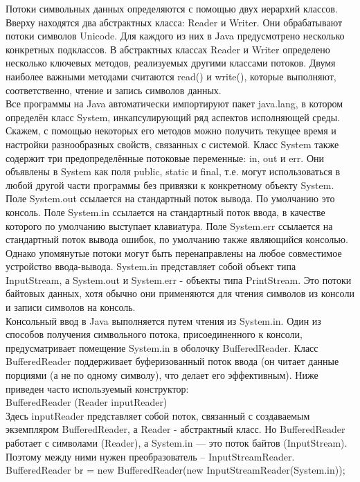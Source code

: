 Потоки символьных данных определяются с помощью двух иерархий классов. Вверху находятся два абстрактных класса: Reader и Writer. Они обрабатывают потоки символов Unicode. Для каждого из них в Java предусмотрено несколько конкретных подклассов. В абстрактных классах Reader и Writer определено несколько ключевых методов, реализуемых другими классами потоков. Двумя наиболее важными методами считаются read() и write(), которые выполняют, соответственно, чтение и запись символов данных. \\
Все программы на Java автоматически импортируют пакет java.lang, в котором определён класс System, инкапсулирующий ряд аспектов исполняющей среды. Скажем, с помощью некоторых его методов можно получить текущее время и настройки разнообразных свойств, связанных с системой. Класс System также содержит три предопределённые потоковые переменные: in, out и err. Они объявлены в System как поля public, static и final, т.е. могут использоваться в любой другой части программы без привязки к конкретному объекту System. Поле System.out ссылается на стандартный поток вывода. По умолчанию это консоль. Поле System.in ссылается на стандартный поток ввода, в качестве которого по умолчанию выступает клавиатура. Поле System.err ссылается на стандартный поток вывода ошибок, по умолчанию также являющийся консолью. Однако упомянутые потоки могут быть перенаправлены на любое совместимое устройство ввода-вывода. System.in представляет собой объект типа InputStream, а System.out и System.err - объекты типа PrintStream. Это потоки байтовых данных, хотя обычно они применяются для чтения символов из консоли и записи символов на консоль. \\
Консольный ввод в Java выполняется путем чтения из System.in. Один из способов получения символьного потока, присоединенного к консоли, предусматривает помещение System.in в оболочку
BufferedReader. Класс BufferedReader поддерживает буферизованный поток ввода (он читает данные порциями (а не по одному символу), что делает его эффективным). Ниже приведен часто используемый конструктор: \\
BufferedReader (Reader inputReader) \\
Здесь inputReader представляет собой поток, связанный с создаваемым экземпляром BufferedReader, а Reader - абстрактный класс. Но BufferedReader работает с символами (Reader), а System.in — это поток байтов (InputStream). Поэтому между ними нужен преобразователь – InputStreamReader. \\
BufferedReader br = new BufferedReader(new InputStreamReader(System.in)); \\
